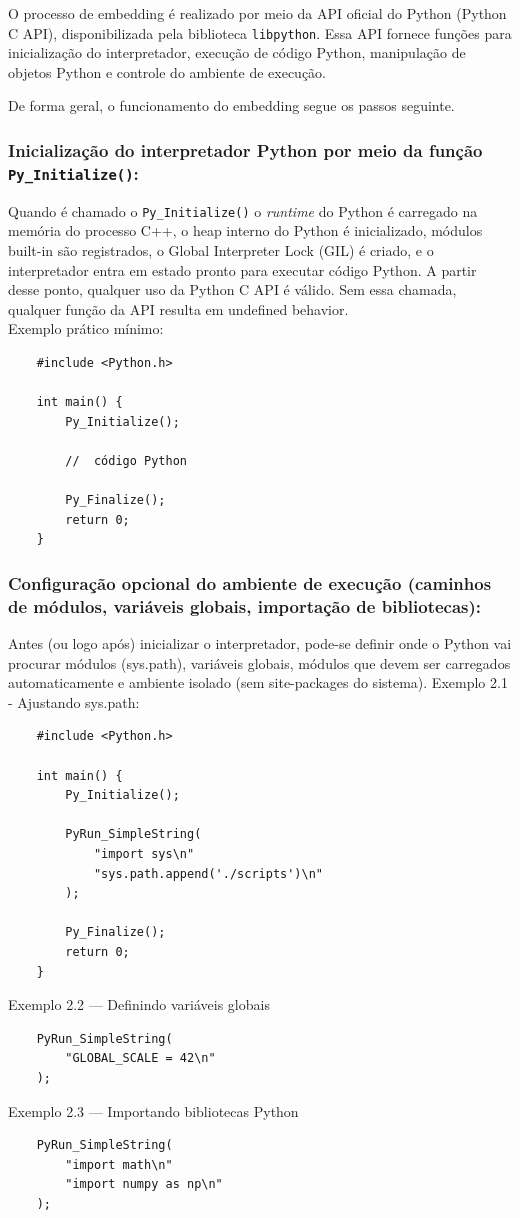 O processo de embedding é realizado por meio da API oficial do Python (Python C API), disponibilizada pela biblioteca \texttt{libpython}. Essa API fornece funções para inicialização do interpretador, execução de código Python, manipulação de objetos Python e controle do ambiente de execução.

De forma geral, o funcionamento do embedding segue os passos seguinte.
    \subsubsection {Inicialização do interpretador Python por meio da função \texttt{Py\_Initialize()}:}
    Quando é chamado o \texttt{Py\_Initialize()} o \emph{runtime} do Python é carregado na memória do processo C++, o heap interno do Python é inicializado, módulos built-in são registrados, o Global Interpreter Lock (GIL) é criado, e o interpretador entra em estado pronto para executar código Python. A partir desse ponto, qualquer uso da Python C API é válido. Sem essa chamada, qualquer função da API resulta em undefined behavior. \\
    Exemplo prático mínimo:
    \begin{verbatim}
    #include <Python.h>
    
    int main() {
        Py_Initialize();
    
        //  código Python
    
        Py_Finalize();
        return 0;
    }
    \end{verbatim}
     \subsubsection { Configuração opcional do ambiente de execução (caminhos de módulos, variáveis globais, importação de bibliotecas):}
    Antes (ou logo após) inicializar o interpretador, pode-se definir onde o Python vai procurar módulos (sys.path), variáveis globais, módulos que devem ser carregados automaticamente e ambiente isolado (sem site-packages do sistema).
    \newline\newline
    Exemplo 2.1 - Ajustando sys.path: 
    \begin{verbatim}
    #include <Python.h>
    
    int main() {
        Py_Initialize();
    
        PyRun_SimpleString(
            "import sys\n"
            "sys.path.append('./scripts')\n"
        );
    
        Py_Finalize();
        return 0;
    }
    \end{verbatim}
    Exemplo 2.2 — Definindo variáveis globais
    \begin{verbatim}
    PyRun_SimpleString(
        "GLOBAL_SCALE = 42\n"
    );
     \end{verbatim}
     Exemplo 2.3 — Importando bibliotecas Python
     \begin{verbatim}
    PyRun_SimpleString(
        "import math\n"
        "import numpy as np\n"
    );
     \end{verbatim}
     
